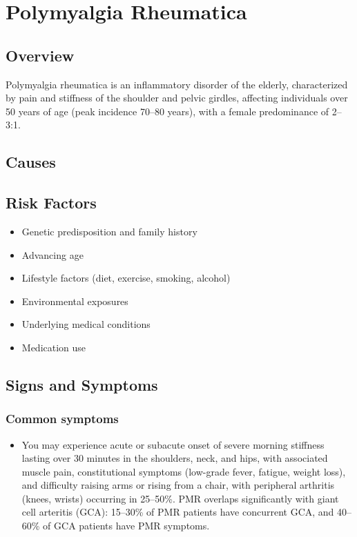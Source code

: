 \chapter{Polymyalgia Rheumatica}
\label{sec:Polymyalgia Rheumatica}

\section{Overview}
Polymyalgia rheumatica is an inflammatory disorder of the elderly, characterized by pain and stiffness of the shoulder and pelvic girdles, affecting individuals over 50 years of age (peak incidence 70--80 years), with a female predominance of 2--3:1.
\section{Causes}
\section{Risk Factors}

\begin{itemize}[noitemsep]
  \item Genetic predisposition and family history
  \item Advancing age
  \item Lifestyle factors (diet, exercise, smoking, alcohol)
  \item Environmental exposures
  \item Underlying medical conditions
  \item Medication use
\end{itemize}
\section{Signs and Symptoms}

\subsection{Common symptoms}
\begin{itemize}[noitemsep]
  \item You may experience acute or subacute onset of severe morning stiffness lasting over 30 minutes in the shoulders, neck, and hips, with associated muscle pain, constitutional symptoms (low-grade fever, fatigue, weight loss), and difficulty raising arms or rising from a chair, with peripheral arthritis (knees, wrists) occurring in 25--50\%. PMR overlaps significantly with giant cell arteritis (GCA): 15--30\% of PMR patients have concurrent GCA, and 40--60\% of GCA patients have PMR symptoms. 
  \end{itemize}

